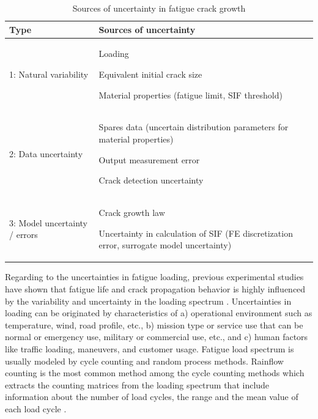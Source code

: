 \begin{table}[htbp]
\centering

\begin{tabular}{p{} p{}}
\hline
Type & \hspace{0.8cm} Sources of uncertainty \\
\hline
1: Natural variability &
\begin{compactitem}
\item Loading
\item Equivalent initial crack size
\item Material properties (fatigue limit, SIF threshold)
\end{compactitem} \\
2: Data uncertainty 
&
\begin{compactitem}
\item Spares data (uncertain distribution parameters for material properties)
\item Output measurement error
\item Crack detection uncertainty
\end{compactitem} \\
3: Model uncertainty / errors
&
\begin{compactitem}
\item Crack growth law 
\item Uncertainty in calculation of SIF (FE discretization error, surrogate model uncertainty)
\end{compactitem}\\
\hline
\end{tabular}

\caption{Sources of uncertainty in fatigue crack growth }
\label{tab:fatigueuncertainty}  
\end{table}

Regarding to the uncertainties in fatigue loading, previous experimental studies have shown that fatigue life and crack propagation behavior is highly influenced by the variability and uncertainty 
in the loading spectrum \citep{MORENO2003597, ZAPATERO2005878}. Uncertainties in loading can be originated by characteristics of a) operational environment such as temperature, wind, road profile, 
etc., b) mission type or service use
that can be normal or emergency use, military or commercial use, etc., and c) human factors like traffic loading, maneuvers, and customer usage. Fatigue load spectrum is usually modeled by 
cycle counting and random process methods. Rainflow counting is the most common method among the cycle counting methods which extracts the counting matrices from the loading spectrum that include 
information about the number of load cycles, the range and the mean value of each load cycle \citep{Dowling1971FatigueFP}. 

